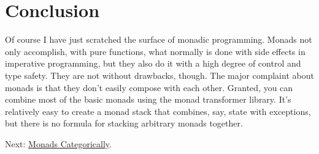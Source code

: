 \section{Conclusion}\label{conclusion}

Of course I have just scratched the surface of monadic programming.
Monads not only accomplish, with pure functions, what normally is done
with side effects in imperative programming, but they also do it with a
high degree of control and type safety. They are not without drawbacks,
though. The major complaint about monads is that they don't easily
compose with each other. Granted, you can combine most of the basic
monads using the monad transformer library. It's relatively easy to
create a monad stack that combines, say, state with exceptions, but
there is no formula for stacking arbitrary monads together.

Next:
\href{https://bartoszmilewski.com/2016/12/27/monads-categorically/}{Monads
Categorically}.

